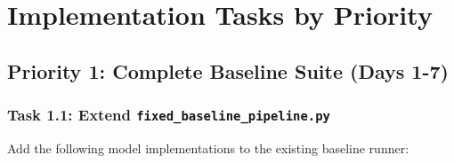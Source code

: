 \documentclass[11pt]{article}
\begin{document}
\section{Implementation Tasks by Priority}

\subsection{Priority 1: Complete Baseline Suite (Days 1-7)}

\subsubsection{Task 1.1: Extend \texttt{fixed\_baseline\_pipeline.py}}

Add the following model implementations to the existing baseline runner:
\end{document}
